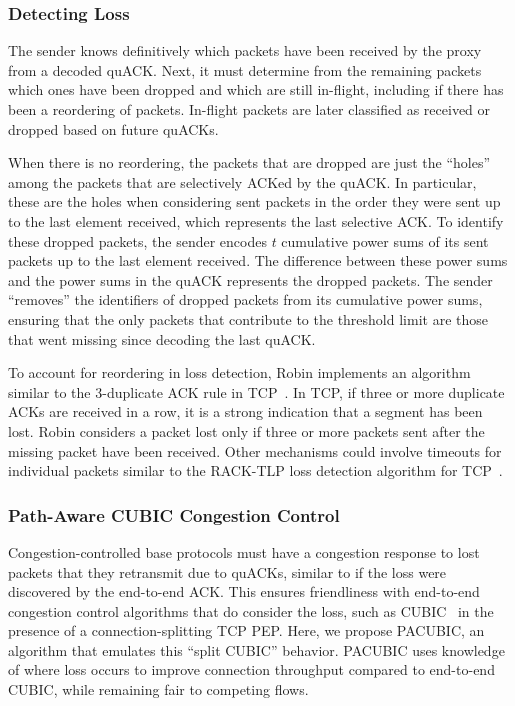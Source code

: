 \subsubsection{Detecting Loss}
\label{sec:design:detecting-loss}

The sender knows definitively which packets have been received by the proxy from
a decoded quACK. Next, it must determine from the remaining packets which ones
have been dropped and which are still in-flight, including if there has been a
reordering of packets. In-flight packets are later
classified as received or dropped based on future quACKs.

When there is no reordering, the packets that are dropped are just the ``holes''
among the packets that are selectively ACKed by the quACK. In particular, these
are the holes when considering sent packets in the order they were sent up to
the last element received, which represents the last selective ACK.
To identify these dropped packets, the sender encodes $t$ cumulative power sums
of its sent packets up to the last element received.
The difference between these power sums and the power
sums in the quACK represents the dropped packets. The sender ``removes'' the
identifiers of dropped packets from its cumulative power sums, ensuring that
the only packets that contribute to the threshold limit are those that
went missing since decoding the last quACK.

To account for reordering in loss detection, Robin implements an algorithm
similar to the 3-duplicate ACK rule in TCP~\cite{rfc5681tcp,rfc2001tcp}.
In TCP, if three or more duplicate ACKs are received in a row, it is a strong
indication that a segment has been lost. Robin considers a packet lost only if
three or more packets sent after the missing packet have been received.
Other mechanisms could involve timeouts for individual packets similar to the
RACK-TLP loss detection algorithm for TCP~\cite{rfc8985}.

\subsubsection{Path-Aware CUBIC Congestion Control}
\label{sec:design:cubic}

Congestion-controlled base protocols must have a congestion response to lost
packets that they retransmit due to quACKs, similar to if the loss were
discovered by the end-to-end ACK.
This ensures friendliness with end-to-end congestion control algorithms that do
consider the loss, such as CUBIC~\cite{ha2008cubic} in the presence of a
connection-splitting TCP PEP.
Here, we propose PACUBIC, an algorithm that emulates this ``split CUBIC''
behavior. PACUBIC uses knowledge of where loss occurs to improve connection
throughput compared to end-to-end CUBIC, while remaining fair to competing flows.

